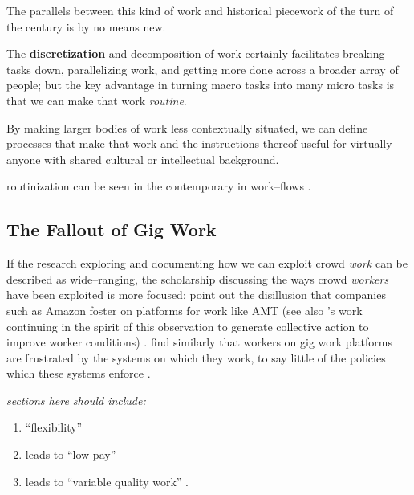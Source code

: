 \documentclass{sigchi}
\begin{document}
The parallels between this kind of work and
historical piecework of the turn of the  century
is by no means new.

The \textbf{discretization} and decomposition of work certainly facilitates
breaking tasks down,
parallelizing work,
and getting more done across a broader array of people;
but the key advantage in turning macro tasks 
into many micro tasks is that we can make that work \textit{routine}.

By making larger bodies of work less contextually situated,
we can define processes that make that work
and the instructions thereof
useful for virtually anyone with shared cultural or intellectual background.

routinization can be seen in the contemporary in work--flows
\cite{foundry,bernsteinSoylent}.




\subsection{The Fallout of Gig Work}\label{sec:Fallout}
If the research exploring and documenting how we can exploit crowd \textit{work} can be described as wide--ranging,
the scholarship discussing the ways crowd \textit{workers} have been exploited is more focused;
\citeauthor{turkopticon} point out the disillusion that companies such as Amazon foster on platforms for work like AMT
(see also \citeauthor{dynamo}'s work
continuing in the spirit of this observation to generate collective action to improve worker conditions)
\cite{turkopticon,dynamo}.
\citeauthor{uberAlgorithm}
find similarly that workers on gig work platforms are frustrated by the systems on which they work,
to say little of the policies which these systems enforce
\cite{uberAlgorithm}.

\itshape
sections here should include:
\begin{enumerate}
\item ``flexibility'' \cite{friedman2014workers,DesigningForLabourUber}
\item leads to ``low pay'' \cite{turkopticon,dynamo}
\item leads to ``variable quality work'' \cite{MaliciousCrowdworkersGadiraju,AccuracyTradeoffsLasecki}.
\end{enumerate}
\upshape
\end{document}
